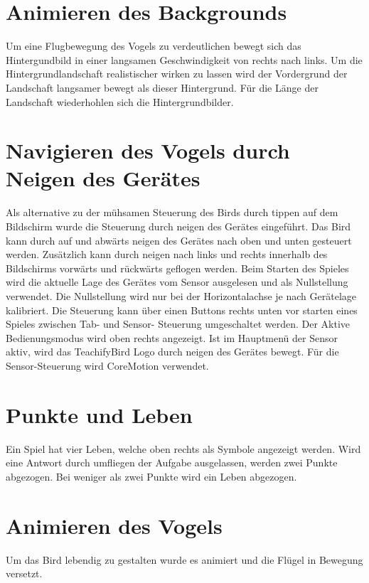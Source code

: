 \section{Animieren des Backgrounds}
Um eine Flugbewegung des Vogels zu verdeutlichen bewegt sich das Hintergundbild in einer langsamen Geschwindigkeit von rechts nach links. Um die Hintergrundlandschaft realistischer wirken zu lassen wird der Vordergrund der Landschaft langsamer bewegt als dieser Hintergrund. Für die Länge der Landschaft wiederhohlen sich die Hintergrundbilder.

\section{Navigieren des Vogels durch Neigen des Gerätes}
Als alternative zu der mühsamen Steuerung des Birds durch tippen auf dem Bildschirm wurde die Steuerung durch neigen des Gerätes eingeführt. Das Bird kann durch auf und abwärts neigen des Gerätes nach oben und unten gesteuert werden. Zusätzlich kann durch neigen nach links und rechts innerhalb des Bildschirms vorwärts und rückwärts geflogen werden.
Beim Starten des Spieles wird die aktuelle Lage des Gerätes vom Sensor ausgelesen und als Nullstellung verwendet. Die Nullstellung wird nur bei der Horizontalachse je nach Gerätelage kalibriert. Die Steuerung kann über einen Buttons rechts unten vor starten eines Spieles zwischen Tab- und Sensor- Steuerung umgeschaltet werden. Der Aktive Bedienungsmodus wird oben rechts angezeigt. Ist im Hauptmenü der Sensor aktiv, wird das TeachifyBird Logo durch neigen des Gerätes bewegt. Für die Sensor-Steuerung wird CoreMotion verwendet. 

\section{Punkte und Leben}
Ein Spiel hat vier Leben, welche oben rechts als Symbole angezeigt werden. Wird eine Antwort durch umfliegen der Aufgabe ausgelassen, werden zwei Punkte abgezogen. Bei weniger als zwei Punkte wird ein Leben abgezogen.

\section{Animieren des Vogels}
Um das Bird lebendig zu gestalten wurde es animiert und die Flügel in Bewegung versetzt.

